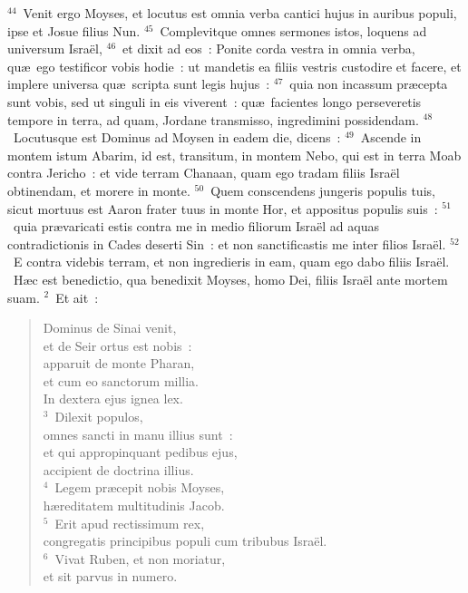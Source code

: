 ${}^{44}$~Venit ergo Moyses, et locutus est omnia verba cantici hujus in auribus populi, ipse et Josue filius Nun.
${}^{45}$~Complevitque omnes sermones istos, loquens ad universum Isra\"el,
${}^{46}$~et dixit ad eos~: Ponite corda vestra in omnia verba, qu\ae\ ego testificor vobis hodie~: ut mandetis ea filiis vestris custodire et facere, et implere universa qu\ae\ scripta sunt legis hujus~:
${}^{47}$~quia non incassum pr\ae cepta sunt vobis, sed ut singuli in eis viverent~: qu\ae\ facientes longo perseveretis tempore in terra, ad quam, Jordane transmisso, ingredimini possidendam.
${}^{48}$~Locutusque est Dominus ad Moysen in eadem die, dicens~:
${}^{49}$~Ascende in montem istum Abarim, id est, transitum, in montem Nebo, qui est in terra Moab contra Jericho~: et vide terram Chanaan, quam ego tradam filiis Isra\"el obtinendam, et morere in monte.
${}^{50}$~Quem conscendens jungeris populis tuis, sicut mortuus est Aaron frater tuus in monte Hor, et appositus populis suis~:
${}^{51}$~quia pr\ae varicati estis contra me in medio filiorum Isra\"el ad aquas contradictionis in Cades deserti Sin~: et non sanctificastis me inter filios Isra\"el.
${}^{52}$~E contra videbis terram, et non ingredieris in eam, quam ego dabo filiis Isra\"el.
~\lettrine[lines=10,image=true,loversize=0.05,lraise=-0.03]{H}{}\ae c est benedictio, qua benedixit Moyses, homo Dei, filiis Isra\"el ante mortem suam.
${}^{2}$~Et ait~: \begin{flushleft}\begin{verse}Dominus de Sinai venit,\\ et de Seir ortus est nobis~:\\ apparuit de monte Pharan,\\ et cum eo sanctorum millia.\\ In dextera ejus ignea lex.\\
${}^{3}$~Dilexit populos,\\ omnes sancti in manu illius sunt~:\\ et qui appropinquant pedibus ejus,\\ accipient de doctrina illius.\\
${}^{4}$~Legem pr\ae cepit nobis Moyses,\\ h\ae reditatem multitudinis Jacob.\\
${}^{5}$~Erit apud rectissimum rex,\\ congregatis principibus populi cum tribubus Isra\"el.\\
${}^{6}$~Vivat Ruben, et non moriatur,\\ et sit parvus in numero.\end{verse}\end{flushleft}


